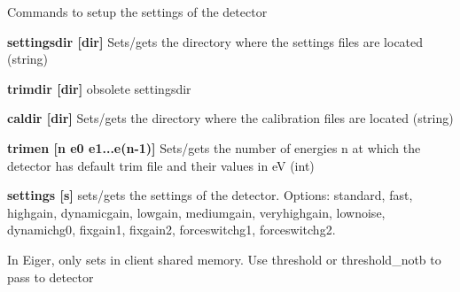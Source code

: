 Commands to setup the settings of the detector


\begin{DoxyItemize}
\item {\bfseries settingsdir \mbox{[}dir\mbox{]}} Sets/gets the directory where the settings files are located (string)
\end{DoxyItemize}


\begin{DoxyItemize}
\item {\bfseries trimdir \mbox{[}dir\mbox{]}} obsolete {\ttfamily settingsdir} 
\end{DoxyItemize}


\begin{DoxyItemize}
\item {\bfseries caldir \mbox{[}dir\mbox{]}} Sets/gets the directory where the calibration files are located (string)
\end{DoxyItemize}


\begin{DoxyItemize}
\item {\bfseries trimen \mbox{[}n e0 e1...e(n-\/1)\mbox{]}} Sets/gets the number of energies n at which the detector has default trim file and their values in eV (int)
\end{DoxyItemize}


\begin{DoxyItemize}
\item {\bfseries settings \mbox{[}s\mbox{]}} sets/gets the settings of the detector. Options: {\ttfamily standard}, {\ttfamily fast}, {\ttfamily highgain}, {\ttfamily dynamicgain}, {\ttfamily lowgain}, {\ttfamily mediumgain}, {\ttfamily veryhighgain}, {\ttfamily lownoise}, {\ttfamily dynamichg0}, {\ttfamily fixgain1}, {\ttfamily fixgain2}, {\ttfamily forceswitchg1}, {\ttfamily forceswitchg2}. \par
 In Eiger, only sets in client shared memory. Use {\ttfamily threshold} or {\ttfamily threshold\_\-notb} to pass to detector 
\end{DoxyItemize}